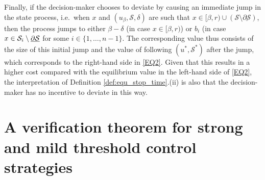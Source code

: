 \documentclass[11pt]{article} %
\numberwithin{komcounter}{section}
\renewcommand{\ul}{\underline}
\begin{document}
Finally, if the decision-maker chooses to deviate by causing an immediate jump in the state process, i.e.~when $x$ and $(u_\beta, \mathcal{S}, \delta)$ are such that $x \in [\beta,r) \cup (\mathcal{S} \setminus \ul{\partial \mathcal{S}})$, then the process jumps to either $\beta-\delta$ (in case $x \in [\beta,r)$) or $b_i$ (in case $x \in  {\cal S}_i\setminus \ul{\partial \mathcal{S}}$ for some $i \in \{1,\ldots,n-1\}$.
The corresponding value thus consists of the size of this initial jump and the value of following $(u^*,\mathcal{S}^*)$ after the jump, which corresponds to the right-hand side in \eqref{EQ2}. 
Given that this results in a higher cost compared with the equilibrium value in the left-hand side of \eqref{EQ2}, the interpretation of Definition \ref{def:equ_stop_time}.(ii) is also that the decision-maker has no incentive to deviate in this way.



\section{A verification theorem for strong and mild threshold control strategies}
\label{sec:main}
\end{document}
